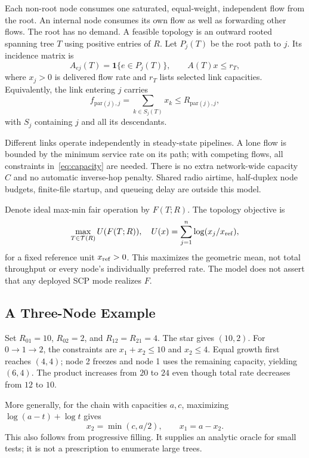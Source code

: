 \documentclass[conference,letterpaper]{IEEEtran}
\begin{document}
Each non-root node consumes one saturated, equal-weight, independent flow from the root. An internal node consumes its own flow as well as forwarding other flows. The root has no demand. A feasible topology is an outward rooted spanning tree $T$ using positive entries of $R$. Let $P_j(T)$ be the root path to $j$. Its incidence matrix is
\begin{equation}
A_{ej}(T)=\mathbf1\{e\in P_j(T)\},\qquad A(T)x\le r_T,
\label{eq:capacity}
\end{equation}
where $x_j>0$ is delivered flow rate and $r_T$ lists selected link capacities. Equivalently, the link entering $j$ carries
\begin{equation}
f_{\mathrm{par}(j),j}=\sum_{k\in S_j(T)}x_k
\le R_{\mathrm{par}(j),j},
\end{equation}
with $S_j$ containing $j$ and all its descendants.

Different links operate independently in steady-state pipelines. A lone flow is bounded by the minimum service rate on its path; with competing flows, all constraints in~\eqref{eq:capacity} are needed. There is no extra network-wide capacity $C$ and no automatic inverse-hop penalty. Shared radio airtime, half-duplex node budgets, finite-file startup, and queueing delay are outside this model.

Denote ideal max-min fair operation by $F(T;R)$. The topology objective is
\begin{equation}
\max_{T\in\mathcal T(R)} U(F(T;R)),\quad
U(x)=\sum_{j=1}^n\log(x_j/x_{\rm ref}),
\label{eq:objective}
\end{equation}
for a fixed reference unit $x_{\rm ref}>0$. This maximizes the geometric mean, not total throughput or every node's individually preferred rate. The model does not assert that any deployed SCP mode realizes $F$.

\subsection{A Three-Node Example}
Set $R_{01}=10$, $R_{02}=2$, and $R_{12}=R_{21}=4$. The star gives $(10,2)$. For $0\to1\to2$, the constraints are $x_1+x_2\le10$ and $x_2\le4$. Equal growth first reaches $(4,4)$; node 2 freezes and node 1 uses the remaining capacity, yielding $(6,4)$. The product increases from $20$ to $24$ even though total rate decreases from $12$ to $10$.

More generally, for the chain with capacities $a,c$, maximizing $\log(a-t)+\log t$ gives
\begin{equation}
x_2=\min(c,a/2),\qquad x_1=a-x_2.
\end{equation}
This also follows from progressive filling. It supplies an analytic oracle for small tests; it is not a prescription to enumerate large trees.
\end{document}
